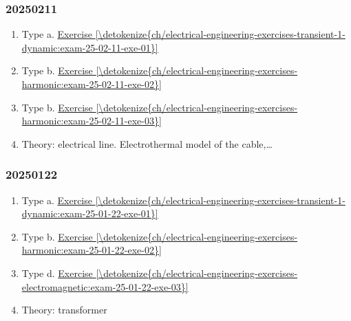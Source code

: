 \documentclass[letterpaper,10pt,italian]{jupyterBook}
\begin{document}
\sphinxAtStartPar
{}
\subsubsection*{2025\sphinxhyphen{}02\sphinxhyphen{}11}
\begin{enumerate}
%
\item {} 
\sphinxAtStartPar
Type a. \hyperref[\detokenize{ch/electrical-engineering-exercises-transient-1-dynamic:exam-25-02-11-exe-01}]{Exercise \ref{\detokenize{ch/electrical-engineering-exercises-transient-1-dynamic:exam-25-02-11-exe-01}}}

\item {} 
\sphinxAtStartPar
Type b. \hyperref[\detokenize{ch/electrical-engineering-exercises-harmonic:exam-25-02-11-exe-02}]{Exercise \ref{\detokenize{ch/electrical-engineering-exercises-harmonic:exam-25-02-11-exe-02}}}

\item {} 
\sphinxAtStartPar
Type b. \hyperref[\detokenize{ch/electrical-engineering-exercises-harmonic:exam-25-02-11-exe-03}]{Exercise \ref{\detokenize{ch/electrical-engineering-exercises-harmonic:exam-25-02-11-exe-03}}}

\item {} 
\sphinxAtStartPar
Theory: electrical line. Electro\sphinxhyphen{}thermal model of the cable,…

\end{enumerate}
\subsubsection*{2025\sphinxhyphen{}01\sphinxhyphen{}22}
\begin{enumerate}
%
\item {} 
\sphinxAtStartPar
Type a. \hyperref[\detokenize{ch/electrical-engineering-exercises-transient-1-dynamic:exam-25-01-22-exe-01}]{Exercise \ref{\detokenize{ch/electrical-engineering-exercises-transient-1-dynamic:exam-25-01-22-exe-01}}}

\item {} 
\sphinxAtStartPar
Type b. \hyperref[\detokenize{ch/electrical-engineering-exercises-harmonic:exam-25-01-22-exe-02}]{Exercise \ref{\detokenize{ch/electrical-engineering-exercises-harmonic:exam-25-01-22-exe-02}}}

\item {} 
\sphinxAtStartPar
Type d. \hyperref[\detokenize{ch/electrical-engineering-exercises-electromagnetic:exam-25-01-22-exe-03}]{Exercise \ref{\detokenize{ch/electrical-engineering-exercises-electromagnetic:exam-25-01-22-exe-03}}}

\item {} 
\sphinxAtStartPar
Theory: transformer

\end{enumerate}
\end{document}
